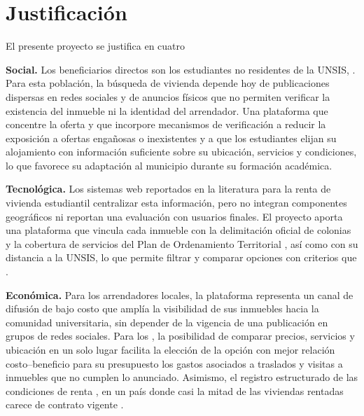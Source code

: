 \section{Justificación}

El presente proyecto se justifica en cuatro 

\textbf{Social.} Los beneficiarios directos son los estudiantes no residentes de la UNSIS, . Para esta población, la búsqueda de vivienda depende hoy de publicaciones dispersas en redes sociales y de anuncios físicos que no permiten verificar la existencia del inmueble ni la identidad del arrendador. Una plataforma que concentre la oferta y que incorpore mecanismos de verificación  a reducir la exposición a ofertas engañosas o inexistentes y a que los estudiantes elijan su alojamiento con información suficiente sobre su ubicación, servicios y condiciones, lo que favorece su adaptación al municipio durante su formación académica.

\textbf{Tecnológica.} Los sistemas web reportados en la literatura para la renta de vivienda estudiantil \parencite{MejiaAvecias2023}  centralizar esta información, pero no integran componentes geográficos ni reportan una evaluación con usuarios finales. El proyecto aporta una plataforma que vincula cada inmueble con la delimitación oficial de colonias y la cobertura de servicios del Plan de Ordenamiento Territorial \parencite{SEINFRA2024}, así como con su distancia a la UNSIS, lo que permite filtrar y comparar opciones con criterios que .

\textbf{Económica.} Para los arrendadores locales, la plataforma representa un canal de difusión de bajo costo que amplía la visibilidad de sus inmuebles hacia la comunidad universitaria, sin depender de la vigencia de una publicación en grupos de redes sociales. Para los , la posibilidad de comparar precios, servicios y ubicación en un solo lugar facilita la elección de la opción con mejor relación costo--beneficio para su presupuesto los gastos asociados a traslados y visitas a inmuebles que no cumplen lo anunciado. Asimismo, el registro estructurado de las condiciones de renta , en un país donde casi la mitad de las viviendas rentadas carece de contrato vigente \parencite{INEGI2021ENVI}. 

